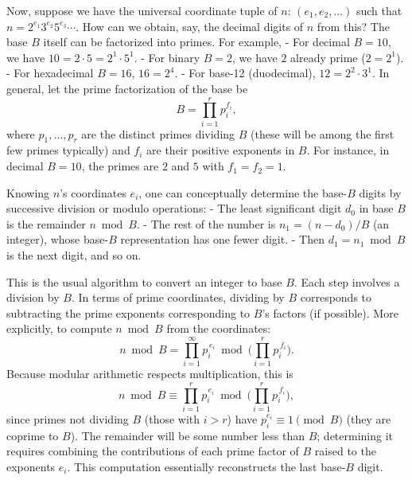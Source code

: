 \documentclass[11pt]{article}
\begin{document}
Now, suppose we have the universal coordinate tuple of $n$: $(e_1, e_2, \dots)$ such that $n = 2^{e_1} 3^{e_2} 5^{e_3} \cdots$. How can we obtain, say, the decimal digits of $n$ from this? The base $B$ itself can be factorized into primes. For example, 
- For decimal $B=10$, we have $10 = 2 \cdot 5 = 2^1 \cdot 5^1$. 
- For binary $B=2$, we have $2$ already prime ($2=2^1$). 
- For hexadecimal $B=16$, $16 = 2^4$. 
- For base-12 (duodecimal), $12 = 2^2 \cdot 3^1$. 
In general, let the prime factorization of the base be 
\[ B = \prod_{i=1}^{r} p_i^{f_i},\] 
where $p_1,\dots,p_r$ are the distinct primes dividing $B$ (these will be among the first few primes typically) and $f_i$ are their positive exponents in $B$. For instance, in decimal $B=10$, the primes are $2$ and $5$ with $f_1=f_2=1$.

Knowing $n$'s coordinates $e_i$, one can conceptually determine the base-$B$ digits by successive division or modulo operations:
- The least significant digit $d_0$ in base $B$ is the remainder $n \bmod B$. 
- The rest of the number is $n_1 = (n - d_0)/B$ (an integer), whose base-$B$ representation has one fewer digit. 
- Then $d_1 = n_1 \bmod B$ is the next digit, and so on.

This is the usual algorithm to convert an integer to base $B$. Each step involves a division by $B$. In terms of prime coordinates, dividing by $B$ corresponds to subtracting the prime exponents corresponding to $B$'s factors (if possible). More explicitly, to compute $n \bmod B$ from the coordinates:
\[ n \bmod B = \prod_{i=1}^\infty p_i^{\,e_i} \bmod \Big(\prod_{i=1}^r p_i^{\,f_i}\Big). \]
Because modular arithmetic respects multiplication, this is 
\[ n \bmod B \equiv \prod_{i=1}^r p_i^{\,e_i} \bmod \Big(\prod_{i=1}^r p_i^{\,f_i}\Big), \] 
since primes not dividing $B$ (those with $i > r$) have $p_i^{e_i} \equiv 1 \pmod{B}$ (they are coprime to $B$). The remainder will be some number less than $B$; determining it requires combining the contributions of each prime factor of $B$ raised to the exponents $e_i$. This computation essentially reconstructs the last base-$B$ digit. 
\end{document}
